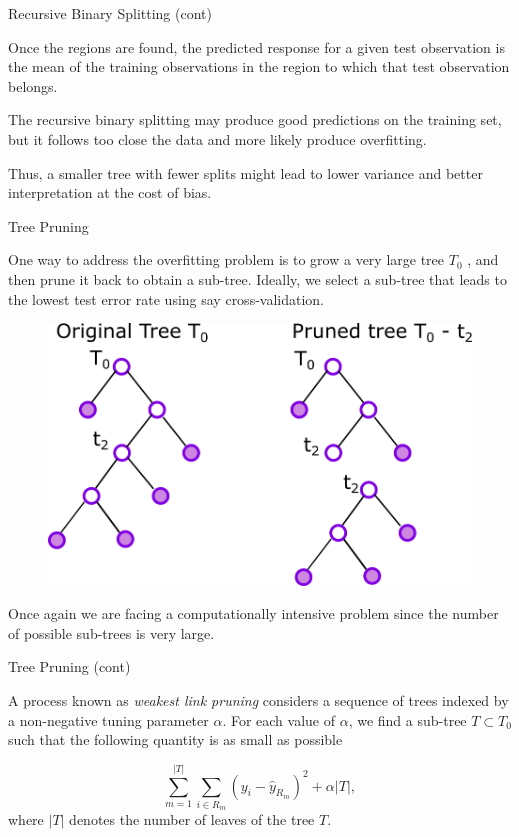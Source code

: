 \documentclass{beamer}
\begin{document}
\begin{frame}{Recursive Binary Splitting (cont)}

Once the regions are found, the predicted response for a given test observation is the mean of the training observations in the region to which that test observation belongs.

The recursive binary splitting may produce good predictions on the training set, but it follows too close the data and more likely produce overfitting. 

Thus, a smaller tree with fewer splits might lead to lower variance and better interpretation at the cost of bias.
\end{frame}

\begin{frame}{Tree Pruning}
	
	
	One way to address the overfitting problem is to grow a very large tree $T_0$ , and then prune it back to obtain a sub-tree. Ideally, we select a sub-tree that leads to the lowest test error rate using say cross-validation. 
	\begin{figure}[h]
		\includegraphics{../../Figures/fig_tree_pruning.png}
	\end{figure}
	
	
	Once again we are facing a computationally intensive problem since the number of possible sub-trees is very large.
	
	
\end{frame}

\begin{frame}{Tree Pruning (cont)}
	
	A process known as {\it weakest link pruning} considers a sequence of trees indexed by a non-negative tuning parameter $\alpha$. For each value of $\alpha$, we find a sub-tree $T \subset T_0$ such that the following quantity is as small as possible
	
	\begin{equation}
		\sum_{m=1}^{|T|} \sum_{i\in R_m} (y_i -\hat{y}_{R_m})^2 + \alpha |T|,
	\end{equation}
	 where $|T|$ denotes the number of leaves of the tree $T$.
\end{frame}
\end{document}
